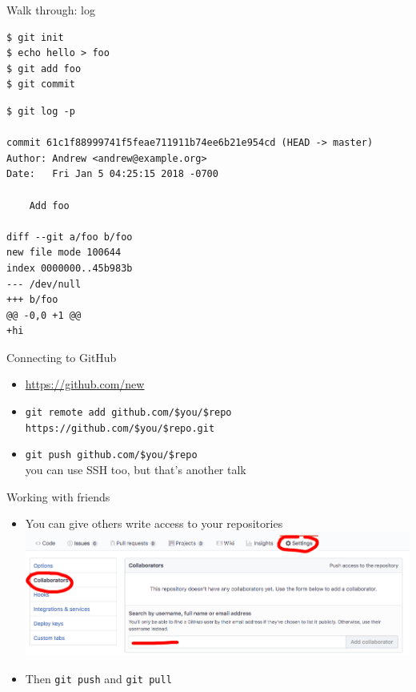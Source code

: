 \documentclass[xcolor=svgnames,17pt]{beamer}
\newcommand*{\sizefont}[1]{%
    \ifcase#1\relax
    \or \tiny
    \or \scriptsize
    \or \footnotesize
    \or \small
    \or \normalsize
    \or \large
    \or \Large
    \or \LARGE
    \or \huge
    \or \Huge
    \fi}
\begin{document}
\begin{frame}[fragile]{Walk through: log}
\sizefont{2}
\begin{verbatim}
$ git init
$ echo hello > foo
$ git add foo
$ git commit
\end{verbatim}
\pause
\begin{verbatim}
$ git log -p

commit 61c1f88999741f5feae711911b74ee6b21e954cd (HEAD -> master)
Author: Andrew <andrew@example.org>
Date:   Fri Jan 5 04:25:15 2018 -0700

    Add foo

diff --git a/foo b/foo
new file mode 100644
index 0000000..45b983b
--- /dev/null
+++ b/foo
@@ -0,0 +1 @@
+hi
\end{verbatim}
\end{frame}

\begin{frame}{Connecting to GitHub}
\begin{itemize}
\item \href{https://github.com/new}{https://github.com/new}
\pause
\item \texttt{git remote add github.com/\$you/\$repo
https://github.com/\$you/\$repo.git}
\pause
\item \texttt{git push github.com/\$you/\$repo}
\pause
\\[\baselineskip] \sizefont{2} you can use SSH too, but that’s another talk
\end{itemize}
\end{frame}

\begin{frame}{Working with friends}
\begin{itemize}
\item You can give others write access to your repositories \\
\includegraphics[width=\paperwidth,center]{github-add-collaborator.png}
\item Then \texttt{git push} and \texttt{git pull}
\end{itemize}
\end{frame}
\end{document}
